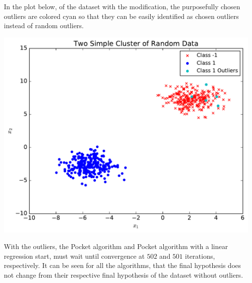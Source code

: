 \documentclass[a4paper]{article}
\begin{document}
\begin {description}
\begin{doublespace}
In the plot below, of the dataset with the modification, the purposefully chosen outliers are colored cyan so that they can be easily identified as chosen outliers instead of random outliers.
\begin{center}
\includegraphics[scale=0.65]{Outliers/hw3_plot.pdf}
\end{center}
With the outliers, the Pocket algorithm and Pocket algorithm with a linear regression start, must wait until convergence at $502$ and $501$ iterations, respectively. It can be seen for all the algorithms, that the final hypothesis does not change from their respective final hypothesis of the dataset without outliers.


\end{doublespace}
\end{description}
\end{document}
